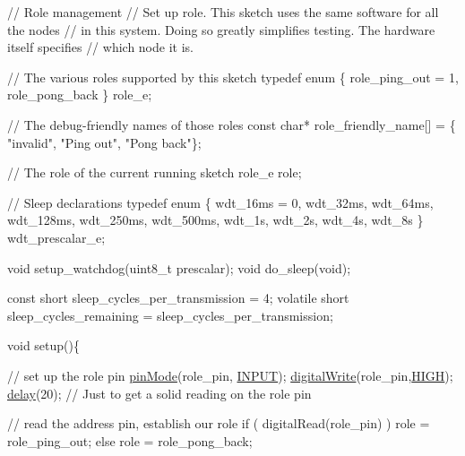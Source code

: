 \begin{DoxyCodeInclude}
\textcolor{comment}{// Role management}
\textcolor{comment}{// Set up role.  This sketch uses the same software for all the nodes}
\textcolor{comment}{// in this system.  Doing so greatly simplifies testing.  The hardware itself specifies}
\textcolor{comment}{// which node it is.}

\textcolor{comment}{// The various roles supported by this sketch}
\textcolor{keyword}{typedef} \textcolor{keyword}{enum} \{ role\_ping\_out = 1, role\_pong\_back \} role\_e;

\textcolor{comment}{// The debug-friendly names of those roles}
\textcolor{keyword}{const} \textcolor{keywordtype}{char}* role\_friendly\_name[] = \{ \textcolor{stringliteral}{"invalid"}, \textcolor{stringliteral}{"Ping out"}, \textcolor{stringliteral}{"Pong back"}\};

\textcolor{comment}{// The role of the current running sketch}
role\_e role;


\textcolor{comment}{// Sleep declarations}
\textcolor{keyword}{typedef} \textcolor{keyword}{enum} \{ wdt\_16ms = 0, wdt\_32ms, wdt\_64ms, wdt\_128ms, wdt\_250ms, wdt\_500ms, wdt\_1s, wdt\_2s, wdt\_4s, 
      wdt\_8s \} wdt\_prescalar\_e;

\textcolor{keywordtype}{void} setup\_watchdog(uint8\_t prescalar);
\textcolor{keywordtype}{void} do\_sleep(\textcolor{keywordtype}{void});

\textcolor{keyword}{const} \textcolor{keywordtype}{short} sleep\_cycles\_per\_transmission = 4;
\textcolor{keyword}{volatile} \textcolor{keywordtype}{short} sleep\_cycles\_remaining = sleep\_cycles\_per\_transmission;



\textcolor{keywordtype}{void} setup()\{

  \textcolor{comment}{// set up the role pin}
  \hyperlink{group__Porting__General_ga361649efb4f1e2fa3c870ca203497d5e}{pinMode}(role\_pin, \hyperlink{group__Porting__General_ga1bb283bd7893b9855e2f23013891fc82}{INPUT});
  \hyperlink{group__Porting__General_gabda89b115581947337690b2f85bfab6e}{digitalWrite}(role\_pin,\hyperlink{group__Porting__General_ga5bb885982ff66a2e0a0a45a8ee9c35e2}{HIGH});
  \hyperlink{group__Porting__General_ga70a331e8ddf9acf9d33c47b71cda4c5f}{delay}(20); \textcolor{comment}{// Just to get a solid reading on the role pin}

  \textcolor{comment}{// read the address pin, establish our role}
  \textcolor{keywordflow}{if} ( digitalRead(role\_pin) )
    role = role\_ping\_out;
  \textcolor{keywordflow}{else}
    role = role\_pong\_back;


\end{DoxyCodeInclude}

